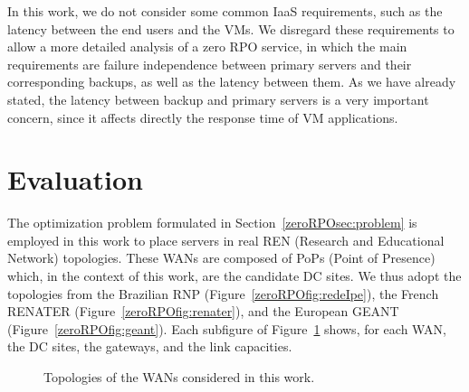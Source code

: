 \documentclass[preprint]{elsarticle}
\begin{document}
In this work, we do not consider some common IaaS requirements, such as the latency between the end users and the VMs.
We disregard these requirements to allow a more detailed analysis of a zero RPO service, in which the main requirements are failure independence between primary servers and their corresponding backups, as well as the latency between them.
As we have already stated, the latency between backup and primary servers is a very important concern, since it affects directly the response time of VM applications.

\section{Evaluation}
\label{zeroRPOsec:eval}

The optimization problem formulated in Section~\ref{zeroRPOsec:problem} is employed in this work to place servers in real REN (Research and Educational Network) topologies. These WANs are composed of PoPs (Point of Presence) which, in the context of this work, are the candidate DC sites. We thus adopt the topologies from the Brazilian RNP (Figure~\ref{zeroRPOfig:redeIpe}), the French RENATER (Figure~\ref{zeroRPOfig:renater}), and the European GEANT (Figure~\ref{zeroRPOfig:geant}). Each subfigure of Figure~\ref{zeroRPOfig:topologies} shows, for each WAN, the DC sites, the gateways, and the link capacities.
\begin{figure}[ht!]
\centering
{}
\caption{Topologies of the WANs considered in this work.}
\label{zeroRPOfig:topologies}
\end{figure}
\end{document}

